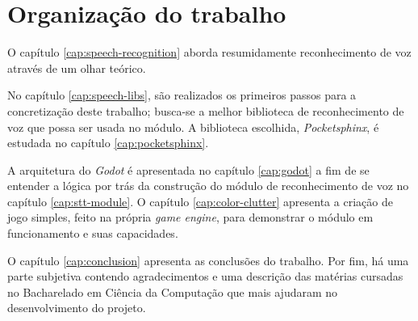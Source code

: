 
\section{Organização do trabalho}

O capítulo \ref{cap:speech-recognition} aborda resumidamente reconhecimento de voz através de um olhar teórico.\iffalse A seguir, no capítulo \ref{cap:hmm}, apresenta-se uma forma de realizar reconhecimento de voz por meio do \textit{Modelo Oculto de Markov}.\fi

No capítulo \ref{cap:speech-libs}, são realizados os primeiros passos para a concretização deste trabalho; busca-se a melhor biblioteca de reconhecimento de voz que possa ser usada no módulo. A biblioteca escolhida, \textit{Pocketsphinx}, é estudada no capítulo \ref{cap:pocketsphinx}.

A arquitetura do \textit{Godot} é apresentada no capítulo \ref{cap:godot} a fim de se entender a lógica por trás da construção do módulo de reconhecimento de voz no capítulo \ref{cap:stt-module}. O capítulo \ref{cap:color-clutter} apresenta a criação de jogo simples, feito na própria \textit{game engine}, para demonstrar o módulo em funcionamento e suas capacidades.

O capítulo \ref{cap:conclusion} apresenta as conclusões do trabalho. Por fim, há uma parte subjetiva contendo agradecimentos e uma descrição das matérias cursadas no Bacharelado em Ciência da Computação que mais ajudaram no desenvolvimento do projeto.
